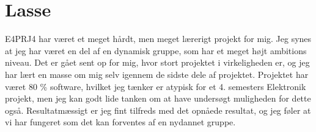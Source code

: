 \section{Lasse} 

E4PRJ4 har været et meget hårdt, men meget lærerigt projekt for mig. 
Jeg synes at jeg har været en del af en dynamisk gruppe, som har et meget højt ambitions niveau. 
Det er gået sent op for mig, hvor stort projektet i virkeligheden er, og jeg har lært en masse om mig selv igennem de sidste dele af projektet. Projektet har været 80 \% software, hvilket jeg tænker er atypisk for et 4. semesters Elektronik projekt, men jeg kan godt lide tanken om at have undersøgt muligheden for dette også. Resultatmæssigt er jeg fint tilfreds med det opnåede resultat, og jeg føler at vi har fungeret som det kan forventes af en nydannet gruppe. 